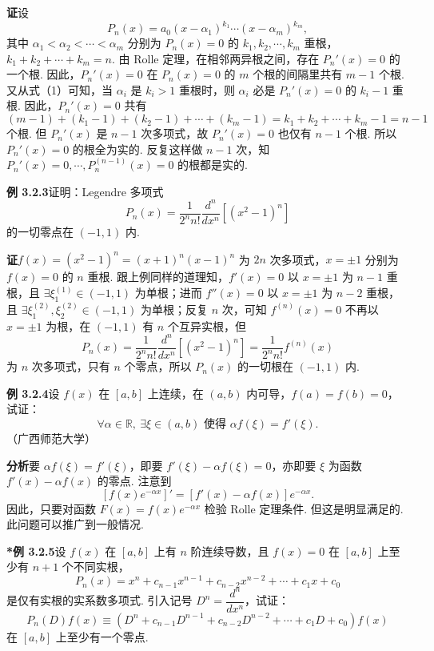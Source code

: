 \documentclass[UTF8, 12pt, fontset=fandol, oneside]{ctexart}
\begin{document}
\noindent\textbf{证}\quad 设
\begin{equation}
  P_n(x)=a_0(x-\alpha_1)^{k_1}\cdots(x-\alpha_m)^{k_m},
\tag{1}
\end{equation}
其中 $\alpha_1<\alpha_2<\cdots<\alpha_m$ 分别为 $P_n(x)=0$ 的 $k_1,k_2,\cdots,k_m$ 重根，$k_1+k_2+\cdots+k_m=n$. 由 Rolle 定理，在相邻两异根之间，存在 $P_n'(x)=0$ 的一个根. 因此，$P_n'(x)=0$ 在 $P_n(x)=0$ 的 $m$ 个根的间隔里共有 $m-1$ 个根. 又从式（1）可知，当 $\alpha_i$ 是 $k_i>1$ 重根时，则 $\alpha_i$ 必是 $P_n'(x)=0$ 的 $k_i-1$ 重根. 因此，$P_n'(x)=0$ 共有
\[
  (m-1)+(k_1-1)+(k_2-1)+\cdots+(k_m-1)
  =k_1+k_2+\cdots+k_m-1=n-1
\]
个根. 但 $P_n'(x)$ 是 $n-1$ 次多项式，故 $P_n'(x)=0$ 也仅有 $n-1$ 个根. 所以 $P_n'(x)=0$ 的根全为实的. 反复这样做 $n-1$ 次，知 $P_n'(x)=0,\cdots,P_n^{(n-1)}(x)=0$ 的根都是实的.

\noindent\textbf{例 3.2.3}\quad 证明：Legendre 多项式
\[
  P_n(x)=\frac{1}{2^nn!}\frac{d^n}{dx^n}\left[(x^2-1)^n\right]
\]
的一切零点在 $(-1,1)$ 内.

\noindent\textbf{证}\quad $f(x)=(x^2-1)^n=(x+1)^n(x-1)^n$ 为 $2n$ 次多项式，$x=\pm1$ 分别为 $f(x)=0$ 的 $n$ 重根. 跟上例同样的道理知，$f'(x)=0$ 以 $x=\pm1$ 为 $n-1$ 重根，且 $\exists\xi_1^{(1)}\in(-1,1)$ 为单根；进而 $f''(x)=0$ 以 $x=\pm1$ 为 $n-2$ 重根，且 $\exists\xi_1^{(2)},\xi_2^{(2)}\in(-1,1)$ 为单根；反复 $n$ 次，可知 $f^{(n)}(x)=0$ 不再以 $x=\pm1$ 为根，在 $(-1,1)$ 有 $n$ 个互异实根，但
\[
  P_n(x)=\frac{1}{2^nn!}\frac{d^n}{dx^n}\left[(x^2-1)^n\right]
  =\frac{1}{2^nn!}f^{(n)}(x)
\]
为 $n$ 次多项式，只有 $n$ 个零点，所以 $P_n(x)$ 的一切根在 $(-1,1)$ 内.

\noindent\textbf{例 3.2.4}\quad 设 $f(x)$ 在 $[a,b]$ 上连续，在 $(a,b)$ 内可导，$f(a)=f(b)=0$，试证：
\[
  \forall\alpha\in\mathbb{R},\ \exists\xi\in(a,b)\text{ 使得 }\alpha f(\xi)=f'(\xi).
\]
（广西师范大学）

\noindent\textbf{分析}\quad 要 $\alpha f(\xi)=f'(\xi)$，即要 $f'(\xi)-\alpha f(\xi)=0$，亦即要 $\xi$ 为函数 $f'(x)-\alpha f(x)$ 的零点. 注意到
\[
  [f(x)e^{-\alpha x}]'=[f'(x)-\alpha f(x)]e^{-\alpha x}.
\]
因此，只要对函数 $F(x)=f(x)e^{-\alpha x}$ 检验 Rolle 定理条件. 但这是明显满足的. 此问题可以推广到一般情况.

\noindent\textbf{*例 3.2.5}\quad 设 $f(x)$ 在 $[a,b]$ 上有 $n$ 阶连续导数，且 $f(x)=0$ 在 $[a,b]$ 上至少有 $n+1$ 个不同实根，
\[
  P_n(x)=x^n+c_{n-1}x^{n-1}+c_{n-2}x^{n-2}+\cdots+c_1x+c_0
\]
是仅有实根的实系数多项式. 引入记号 $D^n=\dfrac{d^n}{dx^n}$，试证：
\[
  P_n(D)f(x)\equiv(D^n+c_{n-1}D^{n-1}+c_{n-2}D^{n-2}+\cdots+c_1D+c_0)f(x)
\]
在 $[a,b]$ 上至少有一个零点.
\end{document}
